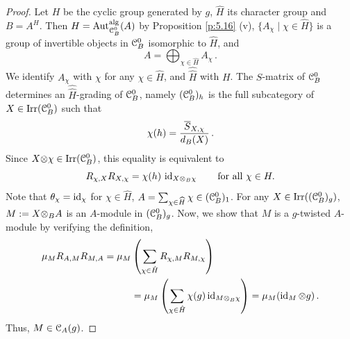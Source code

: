 \documentclass{amsart}
\begin{document}
\begin{proof}
    Let $H$ be the cyclic group generated by $g$, $\hat{H}$ its character group and $B=A^H$. Then $H={\rm Aut}_{{{\EuScript{C}}_B^0}}^{\operatorname{alg}}(A)$ by  Proposition \ref{p:5.16} (v), $\{A_\chi\mid \chi \in \hat{H}\}$ is a group of invertible objects in ${{\EuScript{C}}_B^0}$ isomorphic to $\hat{H}$, and
    $$
A = \bigoplus_{\chi \in \hat{H}} A_\chi\,.
    $$
     We identify $A_{\chi}$ with $\chi$ for any $\chi \in \hat{H}$, and $\hat{\hat{H}}$ with $H$. The $S$-matrix of ${{\EuScript{C}}_B^0}$ determines an $\hat{\hat{H}}$-grading of ${{\EuScript{C}}_B^0}$, namely $({{\EuScript{C}}_B^0})_h$ is the full subcategory of $X \in {\operatorname{Irr}({{\EuScript{C}}_B^0})}$ such that
    $$
    \chi(h) = \frac{\overline S_{X,\chi}}{d_B(X)} \,.
    $$
 Since $X {\otimes} \chi \in {\operatorname{Irr}({{\EuScript{C}}_B^0})}$, this equality is equivalent to
\[
R_{\chi,X}R_{X,\chi}
=
\chi(h)\,\operatorname{id}_{X\otimes_B\chi}
\qquad
\text{for all }\chi\in H.
\]
Note that $\theta_\chi=\operatorname{id}_\chi$ for $\chi\in\widehat{H}$, $A=\sum_{\chi\in\widehat{H}}\chi\in ({{\EuScript{C}}_B^0})_1$.
For any $X  \in \operatorname{Irr}(({{\EuScript{C}}_B^0})_g)$, $M:=X {\otimes}_B A$ is an  $A$-module in $({{\EuScript{C}}_B^0})_g$. Now, we show that $M$ is a $g$-twisted $A$-module by verifying the definition,
    \begin{align*}
         \mu_{M} R_{A,M}R_{M,A}  = \mu_{M} & \left(\sum_{\chi \in \hat{H}}  R_{\chi,M}R_{M,\chi} \right) \\
        &= \mu_{M} \left(\sum_{\chi \in \hat{H}} \chi(g)\operatorname{id}_{M {\otimes}_B \chi} \right)
     = \mu_{M}(\operatorname{id}_{M} {\otimes} g)\,. 
    \end{align*}
    Thus, $M \in {{\EuScript{C}}_A}(g)$.


\end{proof}
\end{document}
